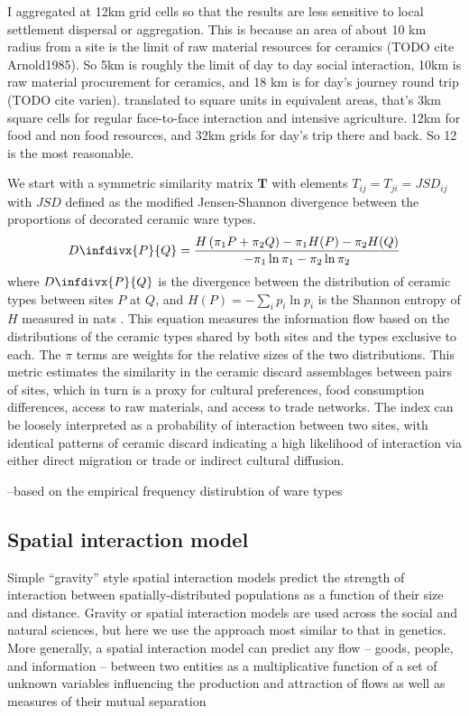 \documentclass[11pt]{wlscirep}
\newcommand{\infdiv}{D\infdivx}
\begin{document}
I aggregated at 12km grid cells so that the results are less sensitive to local settlement dispersal or aggregation. This is because an area of about 10 km radius from a site is the limit of raw material resources for ceramics (TODO cite Arnold1985). So 5km is roughly the limit of day to day social interaction, 10km is raw material procurement for ceramics, and 18 km is for day's journey round trip (TODO cite varien). translated to square units in equivalent areas, that's 3km square cells for regular face-to-face interaction and intensive agriculture. 12km for food and non food resources, and 32km grids for day's trip there and back. So 12 is the most reasonable.

We start with a symmetric similarity matrix $\mathbf{T}$ with elements $T_{ij} = T_{ji} = JSD_{ij}$ with $JSD$ defined as the modified Jensen-Shannon divergence between the proportions of decorated ceramic ware types.
\begin{equation}
    \infdiv{P}{Q} = \frac{H\left(\pi_1P + \pi_2Q\right) - \pi_1H(P) - \pi_2H(Q)}{-\pi_1 \ln \pi_1 -\pi_2 \ln \pi_2}
\end{equation}
where $\infdiv{P}{Q}$ is the divergence between the distribution of ceramic types between sites $P$ at $Q$, and $H(P) = -\sum_i p_i \ln p_i$ is the Shannon entropy of $H$ measured in nats \cite{Masucci2011,PaoloMasucci2012}. This equation measures the information flow based on the distributions of the ceramic types shared by both sites and the types exclusive to each. The $\pi$ terms are weights for the relative sizes of the two distributions. This metric estimates the similarity in the ceramic discard assemblages between pairs of sites, which in turn is a proxy for cultural preferences, food consumption differences, access to raw materials, and access to trade networks. The index can be loosely interpreted as a probability of interaction between two sites, with identical patterns of ceramic discard indicating a high likelihood of interaction via either direct migration or trade or indirect cultural diffusion.

--based on the empirical frequency distirubtion of ware types

\subsection*{Spatial interaction model}
Simple ``gravity'' style spatial interaction models predict the strength of interaction between spatially-distributed populations as a function of their size and distance. Gravity or spatial interaction models are used across the social and natural sciences, but here we use the approach most similar to that in genetics. More generally, a spatial interaction model can predict any flow -- goods, people, and information -- between two entities as a multiplicative function of a set of unknown variables influencing the production and attraction of flows as well as measures of their mutual separation
\end{document}

